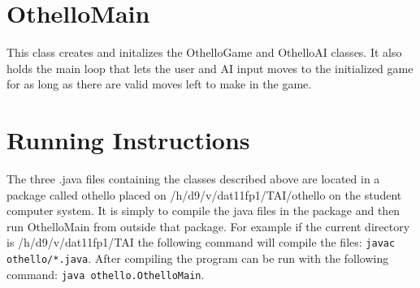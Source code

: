 \documentclass[a4paper]{article}
\begin{document}
\section{OthelloMain}
This class creates and initalizes the OthelloGame and OthelloAI classes. It also holds the main loop that lets the user and AI input moves to the initialized game for as long as there are valid moves left to make in the game.

\section{Running Instructions}
The three .java files containing the classes described above are located in a package called othello placed on /h/d9/v/dat11fp1/TAI/othello on the student computer system. It is simply to compile the java files in the package and then run OthelloMain from outside that package. For example if the current directory is /h/d9/v/dat11fp1/TAI the following command will compile the files: \texttt{javac othello/*.java}. After compiling the program can be run with the following command: \texttt{java othello.OthelloMain}.

\end{document}
